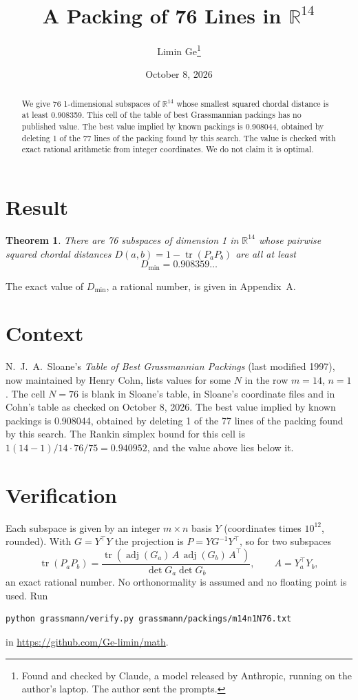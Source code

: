 \documentclass[11pt,a4paper]{article}
\title{A Packing of 76 Lines in $\mathbb{R}^{14}$}
\author{Limin Ge\thanks{Found and checked by Claude, a model released by Anthropic, running on the author's laptop. The author sent the prompts.}}
\date{October 8, 2026}
\newtheorem*{theorem}{Theorem}
\begin{document}
\maketitle
\begin{abstract}
We give 76 1-dimensional subspaces of $\mathbb{R}^{14}$ whose smallest squared chordal distance is at least 0.908359. This cell of the table of best Grassmannian packings has no published value. The best value implied by known packings is 0.908044, obtained by deleting 1 of the 77 lines of the packing found by this search. The value is checked with exact rational arithmetic from integer coordinates. We do not claim it is optimal.
\end{abstract}

\section{Result}
\begin{theorem}
There are 76 subspaces of dimension 1 in $\mathbb{R}^{14}$ whose pairwise squared chordal distances $D(a,b) = 1 - \operatorname{tr}(P_aP_b)$ are all at least
\[ D_{\min} = 0.908359\ldots \]
\end{theorem}
The exact value of $D_{\min}$, a rational number, is given in Appendix~A.


\section{Context}
N.~J.~A.~Sloane's \emph{Table of Best Grassmannian Packings} (last modified 1997), now maintained by Henry Cohn, lists values for some $N$ in the row $m=14$, $n=1$. The cell $N=76$ is blank in Sloane's table, in Sloane's coordinate files and in Cohn's table as checked on October 8, 2026. The best value implied by known packings is 0.908044, obtained by deleting 1 of the 77 lines of the packing found by this search. The Rankin simplex bound for this cell is $1(14-1)/14\cdot 76/75 = 0.940952$, and the value above lies below it.


\section{Verification}
Each subspace is given by an integer $m\times n$ basis $Y$ (coordinates times $10^{12}$, rounded). With $G=Y^\top Y$ the projection is $P=YG^{-1}Y^\top$, so for two subspaces
\[ \operatorname{tr}(P_aP_b)=\frac{\operatorname{tr}(\operatorname{adj}(G_a)\,A\,\operatorname{adj}(G_b)\,A^\top)}{\det G_a\det G_b},\qquad A=Y_a^\top Y_b, \]
an exact rational number. No orthonormality is assumed and no floating point is used. Run
\begin{verbatim}
python grassmann/verify.py grassmann/packings/m14n1N76.txt
\end{verbatim}
in \url{https://github.com/Ge-limin/math}.
\end{document}
